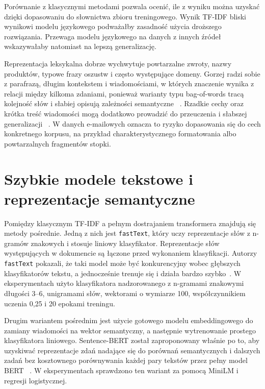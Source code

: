 Porównanie z klasycznymi metodami pozwala ocenić, ile z wyniku można uzyskać
dzięki dopasowaniu do słownictwa zbioru treningowego. Wynik TF-IDF bliski
wynikowi modelu językowego podważałby zasadność użycia droższego rozwiązania.
Przewaga modelu językowego na danych z innych źródeł wskazywałaby natomiast na
lepszą generalizację.

Reprezentacja leksykalna dobrze wychwytuje powtarzalne zwroty, nazwy produktów,
typowe frazy oszustw i często występujące domeny. Gorzej radzi sobie z
parafrazą, długim kontekstem i wiadomościami, w których znaczenie wynika z
relacji między kilkoma zdaniami, ponieważ warianty typu bag-of-words tracą
kolejność słów i słabiej opisują zależności semantyczne
~\autocite{le-distributed-representations-2014}. Rzadkie cechy oraz krótka treść
wiadomości mogą dodatkowo prowadzić do przeuczenia i słabszej generalizacji
~\autocite{xu-alternative-text-representation-2013}. W danych e-mailowych oznacza
to ryzyko dopasowania się do cech konkretnego korpusu, na przykład
charakterystycznego formatowania albo powtarzalnych fragmentów stopki.

\section{Szybkie modele tekstowe i reprezentacje semantyczne}

Pomiędzy klasycznym TF-IDF a pełnym dostrajaniem transformera znajdują się metody
pośrednie. Jedną z nich jest \texttt{fastText}, który uczy reprezentacje słów z
n-gramów znakowych i stosuje liniowy klasyfikator. Reprezentacje słów
występujących w dokumencie są łączone przed wykonaniem klasyfikacji. Autorzy
\texttt{fastText} pokazali, że taki model może być konkurencyjny wobec
głębszych klasyfikatorów tekstu, a jednocześnie trenuje się i działa bardzo
szybko~\autocite{joulin-fasttext-bag-of-tricks}.
W eksperymentach użyto klasyfikatora nadzorowanego z n-gramami znakowymi
długości 3--6, unigramami słów, wektorami o wymiarze 100, współczynnikiem
uczenia 0,25 i 20 epokami treningu.

Drugim wariantem pośrednim jest użycie gotowego modelu embeddingowego do
zamiany wiadomości na wektor semantyczny, a następnie wytrenowanie prostego
klasyfikatora liniowego. Sentence-BERT został zaproponowany właśnie po to, aby
uzyskiwać reprezentacje zdań nadające się do porównań semantycznych i dalszych
zadań bez kosztownego porównywania każdej pary tekstów przez pełny model BERT
~\autocite{reimers-sentence-bert}. W eksperymentach sprawdzono ten wariant za
pomocą MiniLM i regresji logistycznej.


